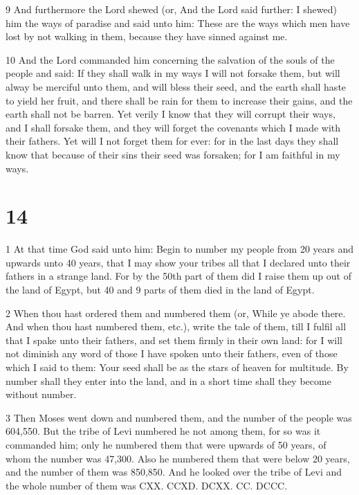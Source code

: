 \par 9 And furthermore the Lord shewed (or, And the Lord said further: I shewed) him the ways of paradise and said unto him: These are the ways which men have lost by not walking in them, because they have sinned against me.

\par 10 And the Lord commanded him concerning the salvation of the souls of the people and said: If they shall walk in my ways I will not forsake them, but will alway be merciful unto them, and will bless their seed, and the earth shall haste to yield her fruit, and there shall be rain for them to increase their gains, and the earth shall not be barren. Yet verily I know that they will corrupt their ways, and I shall forsake them, and they will forget the covenants which I made with their fathers. Yet will I not forget them for ever: for in the last days they shall know that because of their sins their seed was forsaken; for I am faithful in my ways.

\chapter{14}

\par 1 At that time God said unto him: Begin to number my people from 20 years and upwards unto 40 years, that I may show your tribes all that I declared unto their fathers in a strange land. For by the 50th part of them did I raise them up out of the land of Egypt, but 40 and 9 parts of them died in the land of Egypt. 

\par 2 When thou hast ordered them and numbered them (or, While ye abode there. And when thou hast numbered them, etc.), write the tale of them, till I fulfil all that I spake unto their fathers, and set them firmly in their own land: for I will not diminish any word of those I have spoken unto their fathers, even of those which I said to them: Your seed shall be as the stars of heaven for multitude. By number shall they enter into the land, and in a short time shall they become without number. 

\par 3 Then Moses went down and numbered them, and the number of the people was 604,550. But the tribe of Levi numbered he not among them, for so was it commanded him; only he numbered them that were upwards of 50 years, of whom the number was 47,300. Also he numbered them that were below 20 years, and the number of them was 850,850. And he looked over the tribe of Levi and the whole number of them was CXX. CCXD. DCXX. CC. DCCC. 

